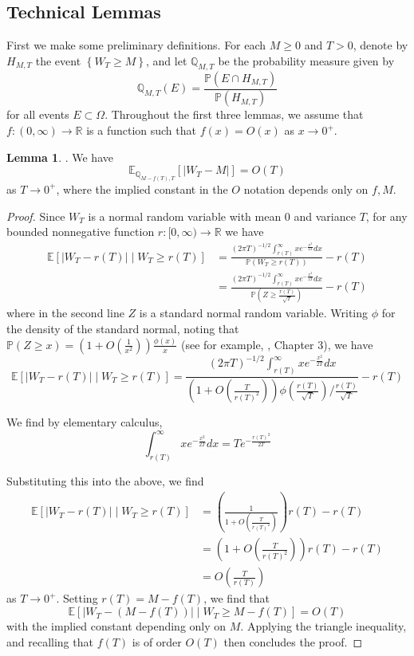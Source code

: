 \documentclass{article}
\theoremstyle{definition}
\newtheorem{lemma}[theorem]{Lemma}
\theoremstyle{definition}
\begin{document}
\subsection{Technical Lemmas}
First we make some preliminary definitions. For each $M \geq 0$ and $T>0$, denote by $H_{M, T}$ the event $\left\{W_{T} \geq M\right\}$, and let $\mathbb{Q}_{M, T}$ be the probability measure given by
$$
\mathbb{Q}_{M, T}(E)=\frac{\mathbb{P}\left(E \cap H_{M, T}\right)}{\mathbb{P}\left(H_{M, T}\right)}
$$
for all events $E \subset \Omega$. Throughout the first three lemmas, we assume that $f:(0, \infty) \rightarrow \mathbb{R}$ is a function such that $f(x)=O(x)$ as $x \rightarrow 0^{+}$.
\begin{lemma}. We have
$$
\mathbb{E}_{\mathbb{Q}_{M-f(T), T}}\left[\left|W_{T}-M\right|\right]=O(T)
$$
as $T \rightarrow 0^{+}$, where the implied constant in the $O$ notation depends only on $f, M$.
\end{lemma}
\begin{proof}Since $W_{T}$ is a normal random variable with mean 0 and variance $T$, for any bounded nonnegative function $r:[0, \infty) \rightarrow \mathbb{R}$ we have
$$
\begin{aligned}
\mathbb{E}\left[\left|W_{T}-r(T)\right| \mid W_{T} \geq r(T)\right] & =\frac{(2 \pi T)^{-1 / 2} \int_{r(T)}^{\infty} x e^{-\frac{x^{2}}{2 T}} d x}{\mathbb{P}\left(W_{T} \geq r(T)\right)}-r(T) \\
& =\frac{(2 \pi T)^{-1 / 2} \int_{r(T)}^{\infty} x e^{-\frac{x^{2}}{2 T}} d x}{\mathbb{P}\left(Z \geq \frac{r(T)}{\sqrt{T}}\right)}-r(T)
\end{aligned}
$$
where in the second line $Z$ is a standard normal random variable. Writing $\phi$ for the density of the standard normal, noting that $\mathbb{P}(Z \geq x)=\left(1+O\left(\frac{1}{x^{2}}\right)\right) \frac{\phi(x)}{x}$ (see for example, \cite{patel1996handbook}, Chapter 3), we have
$$
\mathbb{E}\left[\left|W_{T}-r(T)\right| \mid W_{T} \geq r(T)\right]=\frac{(2 \pi T)^{-1 / 2} \int_{r(T)}^{\infty} x e^{-\frac{x^{2}}{2 T}} d x}{\left(1+O\left(\frac{T}{r(T)^{2}}\right)\right) \phi\left(\frac{r(T)}{\sqrt{T}}\right) / \frac{r(T)}{\sqrt{T}}}-r(T)
$$

We find by elementary calculus,
$$
\int_{r(T)}^{\infty} x e^{-\frac{x^{2}}{2 T}} d x=T e^{-\frac{r(T)^{2}}{2 T}}
$$

Substituting this into the above, we find
$$
\begin{aligned}
\mathbb{E}\left[\left|W_{T}-r(T)\right| \mid W_{T} \geq r(T)\right] & =\left(\frac{1}{1+O\left(\frac{T}{r(T)^{2}}\right)}\right) r(T)-r(T) \\
& =\left(1+O\left(\frac{T}{r(T)^{2}}\right)\right) r(T)-r(T) \\
& =O\left(\frac{T}{r(T)}\right)
\end{aligned}
$$
as $T \rightarrow 0^{+}$. Setting $r(T)=M-f(T)$, we find that
$$
\mathbb{E}\left[\left|W_{T}-(M-f(T))\right| \mid W_{T} \geq M-f(T)\right]=O(T)
$$
with the implied constant depending only on $M$. Applying the triangle inequality, and recalling that $f(T)$ is of order $O(T)$ then concludes the proof.
\end{proof}
\end{document}

